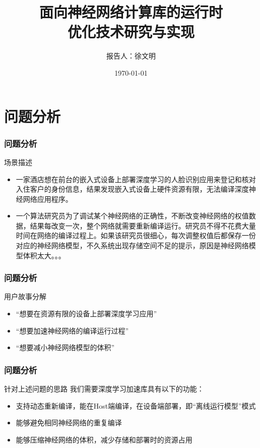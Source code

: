 \documentclass[12pt]{ctexbeamer}
\title[神经网络计算库运行时优化]{
    面向神经网络计算库的运行时\\
    优化技术研究与实现
}
\author[徐文明]{报告人：徐文明}
\institute[USTC]{
中国科学技术大学，软件学院\\
实习单位：北京中科寒武纪科技有限公司
}
\date{\today}
\begin{document}
\startPresentation{}


\section{问题分析}
\begin{frame}
  \frametitle{问题分析}
  \begin{block}{场景描述}
    \begin{itemize}
    \item 一家酒店想在前台的嵌入式设备上部署深度学习的人脸识别应用来登记和核对入住客户的身份信息，结果发现嵌入式设备上硬件资源有限，无法编译深度神经网络应用程序。
    \item 一个算法研究员为了调试某个神经网络的正确性，不断改变神经网络的权值数据，结果每改变一次，整个网络就需要重新编译运行。研究员不得不花费大量时间在网络的编译过程上。如果该研究员很细心，每次调整权值后都保存一份对应的神经网络模型，不久系统出现存储空间不足的提示，原因是神经网络模型体积太大。。。
    \end{itemize}
  \end{block}
\end{frame}

\begin{frame}
  \frametitle{问题分析}
  \begin{block}{用户故事分解}
    \begin{itemize}
    \item “想要在资源有限的设备上部署深度学习应用”
    \item “想要加速神经网络的编译运行过程”
    \item “想要减小神经网络模型的体积”
    \end{itemize}
  \end{block}
\end{frame}

\begin{frame}
  \frametitle{问题分析}
  \begin{block}{针对上述问题的思路}
  	 我们需要深度学习加速库具有以下的功能：
    \begin{itemize}
    \item 支持动态重新编译，能在Host端编译，在设备端部署，即“离线运行模型”模式
    \item 能够避免相同神经网络的重复编译
    \item 能够压缩神经网络的体积，减少存储和部署时的资源占用
    \end{itemize}
  \end{block}
\end{frame}
\end{document}
